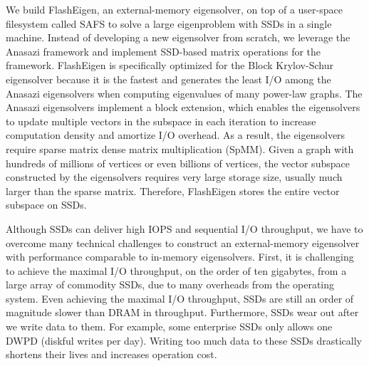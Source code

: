 
We build FlashEigen, an external-memory eigensolver, on top of a user-space
filesystem called SAFS \cite{safs} to solve a large eigenproblem with SSDs
in a single machine. 
Instead of developing a new eigensolver from scratch, we leverage
the Anasazi framework and implement SSD-based matrix operations
for the framework. FlashEigen is specifically optimized for the Block
Krylov-Schur \cite{krylovschur} eigensolver because it is the fastest and
generates the least I/O among the Anasazi eigensolvers when computing
eigenvalues of many power-law graphs. The Anasazi eigensolvers implement
a block extension, which enables the eigensolvers to update multiple vectors
in the subspace in each iteration to increase computation density and amortize
I/O overhead. As a result, the eigensolvers require sparse matrix dense matrix
multiplication (SpMM). Given a graph with hundreds of millions of vertices or
even billions of vertices,
the vector subspace constructed by the eigensolvers requires very large storage
size, usually much larger than the sparse matrix. Therefore, FlashEigen stores
the entire vector subspace on SSDs.


Although SSDs can deliver high IOPS and sequential I/O throughput, we have
to overcome many technical challenges to construct an external-memory
eigensolver with performance comparable to in-memory eigensolvers.
First, it is challenging to achieve the maximal I/O throughput, on the order
of ten gigabytes, from a large array of commodity SSDs, due to many overheads
from the operating system. Even achieving the maximal I/O throughput, SSDs are
still an order of magnitude slower than DRAM in throughput. Furthermore,
SSDs wear out after we write data to them. For example, some enterprise
SSDs \cite{ocz} only allows one DWPD (diskful writes per day). Writing too much
data to these SSDs drastically shortens their lives and increases operation
cost.

